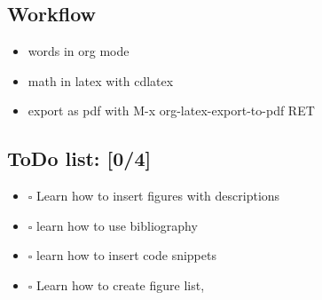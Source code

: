\documentclass[11pt]{article}
\begin{document}
\subsection{Workflow}
\label{sec-1-3}
\begin{itemize}
\item words in org mode
\item math in latex with cdlatex
\item export as pdf with M-x org-latex-export-to-pdf RET
\end{itemize}
\subsection{ToDo list: [0/4]}
\label{sec-1-4}
\begin{itemize}
\item $\square$ Learn how to insert figures with descriptions
\item $\square$ learn how to use bibliography
\item $\square$ learn how to insert code snippets
\item $\square$ Learn how to create figure list,
\end{itemize}
\end{document}
